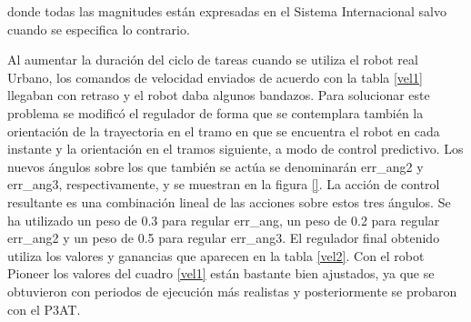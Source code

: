 donde todas las magnitudes están expresadas en el Sistema Internacional salvo cuando se especifica lo contrario.

Al aumentar la duración del ciclo de tareas cuando se utiliza el robot real Urbano, los comandos de velocidad enviados de acuerdo con la tabla \ref{vel1} llegaban con retraso y el robot daba algunos bandazos. Para solucionar este problema se modificó el regulador de forma que se contemplara también la orientación de la trayectoria en el tramo en que se encuentra el robot en cada instante y la orientación en el tramos siguiente, a modo de control predictivo. Los nuevos ángulos sobre los que también se actúa se denominarán err\_ang2 y err\_ang3, respectivamente, y se muestran en la figura \ref{}. La acción de control resultante es una combinación lineal de las acciones sobre estos tres ángulos. Se ha utilizado un peso de 0.3 para regular err\_ang, un peso de 0.2 para regular err\_ang2 y un peso de 0.5 para regular err\_ang3. El regulador final obtenido utiliza los valores y ganancias que aparecen en la tabla \ref{vel2}. Con el robot Pioneer los valores del cuadro \ref{vel1} están bastante bien ajustados, ya que se obtuvieron con periodos de ejecución más realistas y posteriormente se probaron con el P3AT.

